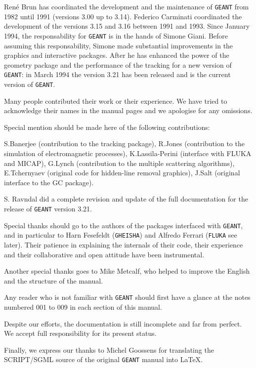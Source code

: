 \par
Ren\'{e} Brun has coordinated the development and the maintenance of {\tt GEANT}
from 1982 until 1991 (versions 3.00 up to 3.14). Federico Carminati
coordinated the development of the versions 3.15 and 3.16 between 1991 and 1993.
Since January 1994, the responsability for {\tt GEANT} is in the hands of Simone
Giani.
Before assuming this responsability, Simone made substantial improvements
in the graphics and interactive packages. After he has enhanced the power
of the geometry package and the performance of the tracking for a new
version of {\tt GEANT}: 
in March 1994 the version 3.21 has been released and is the current version
of {\tt GEANT}.
\par
Many people contributed their
work or their experience. We have tried to acknowledge their names 
in the manual pages and we apologise for any omissions.

Special mention should be made here of
the following contributions:

S.Banerjee
(contribution to the tracking package),
R.Jones
(contribution to the 
simulation of electromagnetic processes),
K.Lassila-Perini
(interface with FLUKA and MICAP),
G.Lynch
(contribution to the multiple scattering algorithms),
E.Tchernyaev
(original code for hidden-line removal graphics),
J.Salt
(original interface to the GC package).

\par
S. Ravndal did a complete revision and update of the full documentation
for the release
of {\tt GEANT} version 3.21.


Special thanks should go to the authors of the packages interfaced
with {\tt GEANT}, and in particular to Harn Fesefeldt ({\tt GHEISHA}) 
and Alfredo Ferrari ({\tt FLUKA} see later). Their
patience in explaining the internals of their code, their
experience and their 
collaborative and open attitude have been instrumental.

Another special thanks goes to Mike Metcalf, who helped to 
improve the English and the structure of the manual.

\par
Any reader who is not familiar with {\tt GEANT}
should first have a glance at the notes numbered 001 to 009 in each
section of this manual.

Despite our efforts, the documentation is still
incomplete and far from perfect. We accept full
responsibility for its present status.
 
Finally, we express our thanks to Michel Goossens for translating the 
SCRIPT/SGML source of the original {\tt GEANT} manual into \LaTeX.


